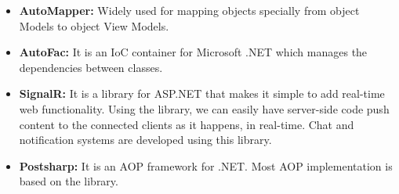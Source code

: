 \begin{itemize}
	\item \textbf{AutoMapper:} Widely used for mapping objects specially from object Models to object View Models.
	\item \textbf{AutoFac:} It is an IoC container for Microsoft .NET which manages the dependencies between classes.
	\item \textbf{SignalR:} It is a library for ASP.NET that makes it simple to add real-time web functionality. Using the library, we can easily have server-side code push content to the connected clients as it happens, in real-time. Chat and notification systems are developed using this library.
	\item \textbf{Postsharp:} It is an AOP framework for .NET. Most AOP implementation is based on the library.
\end{itemize}